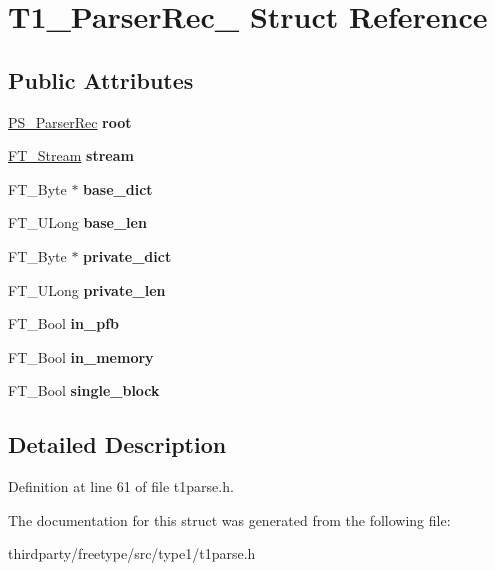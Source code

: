 \hypertarget{struct_t1___parser_rec__}{}\section{T1\+\_\+\+Parser\+Rec\+\_\+ Struct Reference}
\label{struct_t1___parser_rec__}
\subsection*{Public Attributes}
\begin{DoxyCompactItemize}
\item 
\mbox{\label{struct_t1___parser_rec___af260980fecd0f110bf1131c4b0e4f00c}} 
\hyperlink{struct_p_s___parser_rec__}{P\+S\+\_\+\+Parser\+Rec} {\bfseries root}
\item 
\mbox{\label{struct_t1___parser_rec___a0ae89ba7e9d61d51dbf8db87cd01ab2e}} 
\hyperlink{struct_f_t___stream_rec__}{F\+T\+\_\+\+Stream} {\bfseries stream}
\item 
\mbox{\label{struct_t1___parser_rec___ae62c48cfc0aeb66efaeed7454d677beb}} 
F\+T\+\_\+\+Byte $\ast$ {\bfseries base\+\_\+dict}
\item 
\mbox{\label{struct_t1___parser_rec___a9e005e26706ee69ea5a9cc4da8bd6527}} 
F\+T\+\_\+\+U\+Long {\bfseries base\+\_\+len}
\item 
\mbox{\label{struct_t1___parser_rec___aa48177c354c605407fff399d50767e8e}} 
F\+T\+\_\+\+Byte $\ast$ {\bfseries private\+\_\+dict}
\item 
\mbox{\label{struct_t1___parser_rec___a5695b2bee12b7a7f60dda3766db046b3}} 
F\+T\+\_\+\+U\+Long {\bfseries private\+\_\+len}
\item 
\mbox{\label{struct_t1___parser_rec___ab3a69a74c4cf9a2078fbda8811063ebf}} 
F\+T\+\_\+\+Bool {\bfseries in\+\_\+pfb}
\item 
\mbox{\label{struct_t1___parser_rec___a4aeb6bd91fbf62e5963e71e930859812}} 
F\+T\+\_\+\+Bool {\bfseries in\+\_\+memory}
\item 
\mbox{\label{struct_t1___parser_rec___a6a5ce5195db0d543a213211b69f820b2}} 
F\+T\+\_\+\+Bool {\bfseries single\+\_\+block}
\end{DoxyCompactItemize}


\subsection{Detailed Description}


Definition at line 61 of file t1parse.\+h.



The documentation for this struct was generated from the following file\+:\begin{DoxyCompactItemize}
\item 
thirdparty/freetype/src/type1/t1parse.\+h\end{DoxyCompactItemize}
